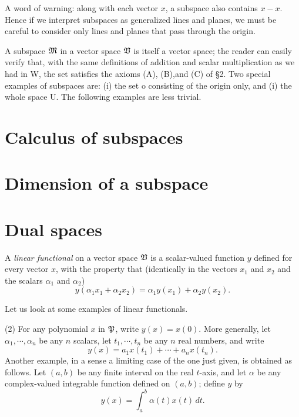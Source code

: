 A word of warning: along with each vector \(x\), a subspace also contains \(x-x\). Hence if we interpret subspaces as generalized lines and planes, we must be careful to consider only lines and planes that pass through the origin.

A subspace \(\frak{M}\) in a vector space \(  \frak{V}\) is itself a vector space; the reader
can easily verify that, with the same definitions of addition and scalar
multiplication as we had in W, the set satisfies the axioms (A), (B),and (C)
of §2.
Two special examples of subspaces are: (i) the set o consisting of the
origin only, and (i) the whole space U. The following examples are less trivial.


\section{Calculus of subspaces}

\section{Dimension of a subspace}

\section{Dual spaces}

\begin{definition}
    A \emph{linear functional} on a vector space \(\frak{V}\) is a scalar-valued
    function \(y\) defined for every vector \(x\), with the property that
    (identically in the vectors \(x_1\) and \(x_2\) and the scalars \(\alpha_1\)
    and \(\alpha_2\))
    \begin{equation*}
        y(\alpha_1 x_1 + \alpha_2 x_2) = \alpha_1 y(x_1) + \alpha_2 y(x_2).
    \end{equation*}
\end{definition}

Let us look at some examples of linear functionals.

(2) For any polynomial \(x\) in \(\frak{P}\), write \(y(x) = x(0)\). More
generally, let \(\alpha_1, \cdots, \alpha_n\) be any \(n\) scalars, let \(t_1,
\cdots, t_n\) be any \(n\) real numbers, and write
\begin{equation*}
    y(x) = a_1 x(t_1) + \cdots + a_n x(t_n).
\end{equation*}
Another example, in a sense a limiting case of the one just given, is obtained
as follows. Let \((a, b)\) be any finite interval on the real \(t\)-axis, and
let \(\alpha\) be any complex-valued integrable function defined on \((a, b)\);
define \(y\) by
\begin{equation*}
    y(x) = \int_a^b \alpha(t) x(t) \, dt.
\end{equation*}


